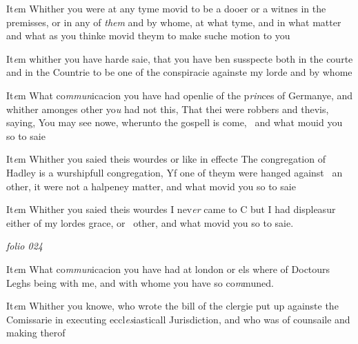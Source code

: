 \documentclass[12pt, a4paper]{book}
\begin{document}
		\ifthenelse{\isodd{\thepage}}
		{\reversemarginpar}
		{\normalmarginpar}
		It\textit{e}m Whither you were at any tyme movid to be a
 dooer or a witnes in the premisses, or in any of \textit{them}
 and by whome, at what tyme, and in what matter
 and what as you thinke movid theym to make suche
 motion to you
 	
		\ifthenelse{\isodd{\thepage}}
		{\reversemarginpar}
		{\normalmarginpar}
		It\textit{e}m whither you have harde saie, that you have ben
 susspecte both in the courte and in the Countrie to be
 one of the conspiracie againste my lorde and by whome
 	
		\ifthenelse{\isodd{\thepage}}
		{\reversemarginpar}
		{\normalmarginpar}
		
 It\textit{e}m What co\textit{mmun}icacion you have had openlie of the p\textit{rin}ces
 of Germanye, and whither amonges other yo\textit{u} had
 not this, That thei were robbers and thevis, saying,
 You may see nowe, wherunto the gospell is come, 
 and what mouid you so to saie
 	
		\ifthenelse{\isodd{\thepage}}
		{\reversemarginpar}
		{\normalmarginpar}
		
 It\textit{e}m Whither you saied theis wourdes or like in effecte
 The congregation of Hadley is a wurshipfull
 congregation, Yf one of theym were hanged against 
 an other, it were not a halpeney matter, and what
 movid you so to saie
 	
		\ifthenelse{\isodd{\thepage}}
		{\reversemarginpar}
		{\normalmarginpar}
		
 		It\textit{e}m Whither you saied theis wourdes I nev\textit{er} came to C
 		but I had displeasur either of my lordes grace, or 
 other, and what movid you so to saie.

\dotfill
					

\textit{folio 024}



 	
		\ifthenelse{\isodd{\thepage}}
		{\reversemarginpar}
		{\normalmarginpar}
		It\textit{e}m What co\textit{mmun}icacion you have had at london or els where
 of Doctours Leghs being with me, and with whome you
 have so co\textit{m}muned.
 	
		\ifthenelse{\isodd{\thepage}}
		{\reversemarginpar}
		{\normalmarginpar}
		
 It\textit{e}m Whither you knowe, who wrote the bill of the clergie
 put up againste the Comissarie in executing eccl\textit{es}iasticall
 Jurisdiction, and who was of counsaile and making
 therof
\end{document}
